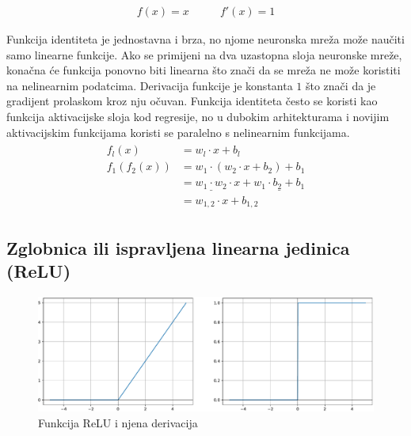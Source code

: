 \documentclass[times, utf8, numeric, diplomski]{fer}
\begin{document}
\begin{equation}
\begin{split}
f(x) = x
\end{split}
\qquad
\begin{split}
f'(x) = 1
\end{split}
\end{equation}

Funkcija identiteta je jednostavna i brza, no njome neuronska mreža može naučiti samo linearne funkcije. Ako se primijeni na dva uzastopna sloja neuronske mreže, konačna će funkcija ponovno biti linearna što znači da se mreža ne može koristiti na nelinearnim podatcima. Derivacija funkcije je konstanta $1$ što znači da je gradijent prolaskom kroz nju očuvan. Funkcija identiteta često se koristi kao funkcija aktivacijske sloja kod regresije, no u dubokim arhitekturama \citep{resnet,densenet} i novijim aktivacijskim funkcijama \citep{swish,elish} koristi se paralelno s nelinearnim funkcijama.
\begin{align}
\begin{split}
f_l(x) &= w_l \cdot x + b_l \\
f_1(f_2(x)) &= w_1 \cdot (w_2 \cdot x + b_2) + b_1 \\
&= \underline{w_1 \cdot w_2} \cdot x + \underline{w_1 \cdot b_2 + b_1} \\
&= w_{1,2} \cdot x + b_{1,2}
\end{split}
\end{align}

\subsection{Zglobnica ili ispravljena linearna jedinica (ReLU)}
\label{func:relu}

\begin{figure}[H]
\includegraphics[width=\textwidth]{ReLU.pdf}
\centering
\caption{Funkcija ReLU i njena derivacija}
\label{fig:relu}
\end{figure}
\end{document}
